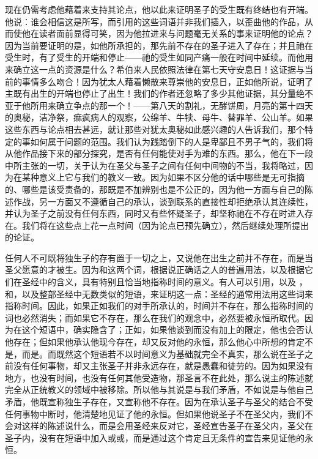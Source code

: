 现在仍需考虑他藉着来支持其论点，他以此来证明圣子的受生既有终结也有开端。他说：谁会相信这是所写，而引用的这些词语并非我们插入，以歪曲他的作品，从而使他在读者面前显得可笑，因为他拉进来与问题毫无关系的事来证明他的论点？因为当前要证明的是，如他所承担的，那先前不存在的圣子进入了存在；并且祂在受生时，有了受生的开端和停止——祂的受生如同产痛一般在时间中延续。而他用来确立这一点的资源是什么？希伯来人民依照法律在第七天守安息日！这证据与当前的事情多么吻合！因为犹太人藉着懒散来尊崇他的安息日，正如他所说，证明了主既有出生的开端也停止了出生！我们的作者还忽略了多少其他证据，其分量绝不亚于他所用来确立争点的那一个！——第八天的割礼，无酵饼周，月亮的第十四天的奥秘，洁净祭，痲疯病人的观察，公绵羊、牛犊、母牛、替罪羊、公山羊。如果这些东西与论点相去甚远，就让那些对犹太奥秘如此感兴趣的人告诉我们，那个特定的事如何属于问题的范围。我们认为践踏倒下的人是卑鄙且不男子气的，我们将从他作品接下来的部分探究，是否有任何能使对手为难的东西。那么，他在下一段中所主张的一切，关于认为在圣父与圣子之间有任何中间物的不当，我将略过，因为在某种意义上它与我们的教义一致。因为如果不区分他的话中哪些是无可指摘的、哪些是该受责备的，那既是不加辨别也是不公正的，因为他一方面与自己的陈述作战，另一方面又不遵循自己的承认，谈到联系的直接性却拒绝承认其连续性，并认为圣子之前没有任何东西，同时又有些怀疑圣子，却坚称祂在不存在时进入存在。我们将在这些点上花一点时间（因为论点已预先确立），然后继续处理所提出的论证。\par

任何人不可既将独生子的存有置于一切之上，又说他在出生之前并不存在，而是当圣父愿意的才被生。因为和这两个词，根据说正确话之人的普遍用法，以及根据它们在圣经中的含义，具有特别且恰当地指称时间的意义。有人可以引用，以及 ，和，以及整部圣经中无数类似的短语，来证明这一点：圣经的通常用法用这些词来指称时间。因此，如果正如我们的对手所承认的，时间并不存在，那么指称时间的词也必然消失；而如果它不存在，那么在我们的观念中，必然要被永恒所取代。因为在这个短语中，确实隐含了；正如，如果他谈到而没有加上的限定，他也会否认他存在；但如果他承认他现今存在，却又反对他的永恒，那么他心中所想的肯定不是，而是。而既然这个短语若不以时间意义为基础就完全不真实，那么说在圣子之前没有任何事物，却又主张圣子并非永远存在，就是愚蠢和徒劳的。因为如果没有地方，也没有时间，也没有任何其他受造物，那圣言不在此处，那么说主的陈述就完全从正统教义的领域中被移除。所以他与其说是与我们矛盾，不如说是与他自己矛盾，他既宣称独生子存在，又宣称他不存在。因为在承认圣子与圣父的结合不受任何事物中断时，他清楚地见证了他的永恒。但如果他说圣子不在圣父内，我们不会对这样的陈述说什么，而是会用圣经来反对它，圣经宣告圣子在圣父内，圣父在圣子内，没有在短语中加入或或，而是通过这个肯定且无条件的宣告来见证他的永恒。\par


